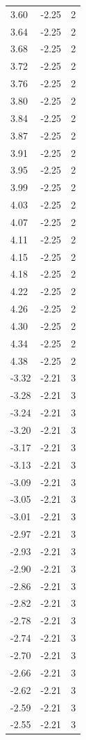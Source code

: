 \begin{longtable}{lrr}
  3.60 & -2.25 & 2 \\
  3.64 & -2.25 & 2 \\
  3.68 & -2.25 & 2 \\
  3.72 & -2.25 & 2 \\
  3.76 & -2.25 & 2 \\
  3.80 & -2.25 & 2 \\
  3.84 & -2.25 & 2 \\
  3.87 & -2.25 & 2 \\
  3.91 & -2.25 & 2 \\
  3.95 & -2.25 & 2 \\
  3.99 & -2.25 & 2 \\
  4.03 & -2.25 & 2 \\
  4.07 & -2.25 & 2 \\
  4.11 & -2.25 & 2 \\
  4.15 & -2.25 & 2 \\
  4.18 & -2.25 & 2 \\
  4.22 & -2.25 & 2 \\
  4.26 & -2.25 & 2 \\
  4.30 & -2.25 & 2 \\
  4.34 & -2.25 & 2 \\
  4.38 & -2.25 & 2 \\
  -3.32 & -2.21 & 3 \\
  -3.28 & -2.21 & 3 \\
  -3.24 & -2.21 & 3 \\
  -3.20 & -2.21 & 3 \\
  -3.17 & -2.21 & 3 \\
  -3.13 & -2.21 & 3 \\
  -3.09 & -2.21 & 3 \\
  -3.05 & -2.21 & 3 \\
  -3.01 & -2.21 & 3 \\
  -2.97 & -2.21 & 3 \\
  -2.93 & -2.21 & 3 \\
  -2.90 & -2.21 & 3 \\
  -2.86 & -2.21 & 3 \\
  -2.82 & -2.21 & 3 \\
  -2.78 & -2.21 & 3 \\
  -2.74 & -2.21 & 3 \\
  -2.70 & -2.21 & 3 \\
  -2.66 & -2.21 & 3 \\
  -2.62 & -2.21 & 3 \\
  -2.59 & -2.21 & 3 \\
  -2.55 & -2.21 & 3 \\

\end{longtable}
